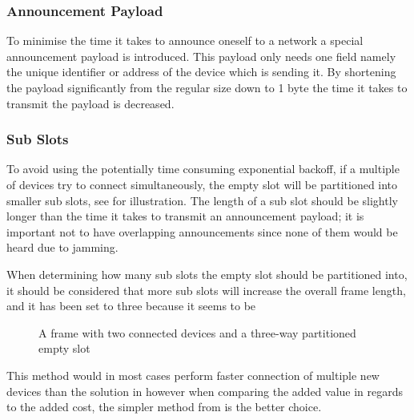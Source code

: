 \subsubsection*{Announcement Payload}\label{apay} %
\label{ssub:announcements}
To minimise the time it takes to announce oneself to a network a special announcement payload is introduced.
This payload only needs one field namely the unique identifier or address of the device which is sending it.
By shortening the payload significantly from the regular size down to 1 byte the time it takes to transmit the payload is decreased.

\subsubsection{Sub Slots} %
\label{ssub:sub_slots}
To avoid using the potentially time consuming exponential backoff, if a multiple of devices try to connect simultaneously, the empty slot will be partitioned into smaller sub slots, see  for illustration. 
The length of a sub slot should be slightly longer than the time it takes to transmit an announcement payload; it is important not to have overlapping announcements since none of them would be heard due to jamming.

When determining how many sub slots the empty slot should be partitioned into, it should be considered that more sub slots will increase the overall frame length, and it has been set to three because it seems to be 

\begin{figure}[h]
    \centering \footnotesize
    
    \caption{A frame with two connected devices and a three-way partitioned empty slot}
    \label{fig:frame_wsubslots}
\end{figure}

\noindent
This method would in most cases perform faster connection of multiple new devices than the solution in  however when comparing the added value in regards to the added cost, the simpler method from  is the better choice.